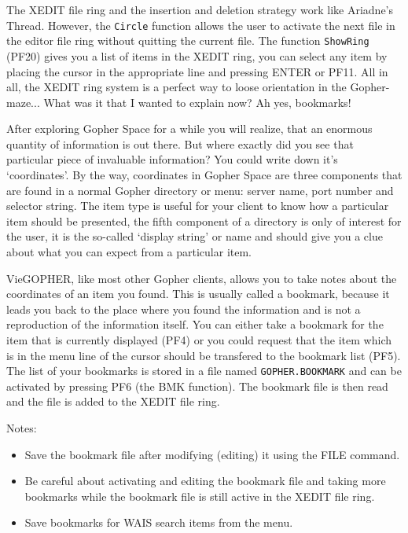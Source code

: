 
The XEDIT file ring and the insertion and deletion strategy work like
Ariadne's Thread.  However, the {\tt Circle} function allows the user
to activate the next file in the editor file ring without quitting the
current file.  The function {\tt ShowRing} (PF20) gives you a list of
items in the XEDIT ring, you can select any item by placing the cursor
in the appropriate line and pressing ENTER or PF11.  All in all, the
XEDIT ring system is a perfect way to loose orientation in the
Gopher-maze...  What was it that I wanted to explain now?  Ah yes,
bookmarks!




After exploring Gopher Space for a while you will realize, that an
enormous quantity of information is out there.  But where exactly
did you see that particular piece of invaluable information?  You could
write down it's `coordinates'.  By the way, coordinates in Gopher Space
are three components that are found in a normal Gopher directory or menu:
server name, port number and selector string.  The item type is useful
for your client to know how a particular item should be presented, the
fifth component of a directory is only of interest for the user, it is
the so-called `display string' or name and should give you a clue about
what you can expect from a particular item.

VieGOPHER, like most other Gopher clients, allows you to take notes about
the coordinates of an item you found.  This is usually called a bookmark,
because it leads you back to the place where you found the information
and is not a reproduction of the information itself.
You can either take a bookmark for the item that is currently displayed
(PF4) or you could request that the item which is in the menu line of the
cursor should be transfered to the bookmark list (PF5).  The list of your
bookmarks is stored in a file named {\tt GOPHER.BOOKMARK} and can be
activated by pressing PF6 (the BMK function).  The bookmark file is then
read and the file is added to the XEDIT file ring.

\noindent Notes:
\begin{itemize}
\item   Save the bookmark file after modifying (editing) it using
        the FILE command.
\item   Be careful about activating and editing the bookmark file
        and taking more bookmarks while the bookmark file is still
        active in the XEDIT file ring.
\item   Save bookmarks for WAIS search items from the menu.
\end{itemize}



